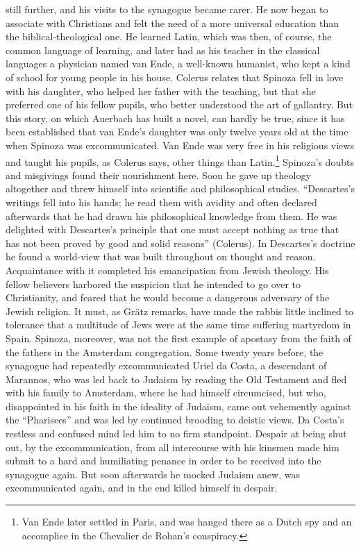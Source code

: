 \documentclass[12pt]{book}
\newcommand{\opage}[1]{\marginnote{\footnotesize\textit{[#1]}}}
\begin{document}
still further, and his visits to the synagogue became rarer. He now began to
associate with Christians and felt the need of a more universal education than the
biblical-theological one. He learned Latin, which was then, of course, the common
language of learning, and later had as his teacher in the classical languages a
physician named van Ende, a well-known humanist, who kept a kind of school for young
people in his house. Colerus relates that Spinoza fell in love with his daughter, who
helped her father with the teaching, but that she preferred one of his fellow pupils,
who better understood the art of gallantry. But this story, on which Auerbach has
built a novel, can hardly be true, since it has been established that van Ende's
daughter was only twelve years old at the time when Spinoza was excommunicated. Van
Ende was very free in his religious views and taught his pupils, as Colerus says,
other things than Latin.\footnote{Van Ende later settled in Paris, and was hanged
there as a Dutch spy and an accomplice in the Chevalier de Rohan's conspiracy.}
Spinoza's \opage{24}doubts and misgivings found their nourishment here. Soon he gave
up theology altogether and threw himself into scientific and philosophical studies.
``Descartes's writings fell into his hands; he read them with avidity and often
declared afterwards that he had drawn his philosophical knowledge from them. He was
delighted with Descartes's principle that one must accept nothing as true that has not
been proved by good and solid reasons'' (Colerus). In Descartes's doctrine he found a
world-view that was built throughout on thought and reason. Acquaintance with it
completed his emancipation from Jewish theology. His fellow believers harbored the
suspicion that he intended to go over to Christianity, and feared that he would
become a dangerous adversary of the Jewish religion. It must, as Grätz remarks, have
made the rabbis little inclined to tolerance that a multitude of Jews were at the
same time suffering martyrdom in Spain. Spinoza, moreover, was not the first example
of apostasy from the faith of the fathers in the Amsterdam congregation. Some twenty
years before, the synagogue had repeatedly excommunicated Uriel da Costa, a
descendant of Marannos, who was led back to Judaism by reading the Old Testament and
fled with his family to Amsterdam, where he had himself circumcised, but who,
disappointed in his faith in the ideality of Judaism, came out vehemently against the
``Pharisees'' and was led by continued brooding to deistic views. Da Costa's restless
and confused mind led him to no firm standpoint. Despair at being shut out, by the
excommunication, from all intercourse with his kinsmen made him \opage{25}submit to a
hard and humiliating penance in order to be received into the synagogue again. But
soon afterwards he mocked Judaism anew, was excommunicated again, and in the end
killed himself in despair.
\end{document}
